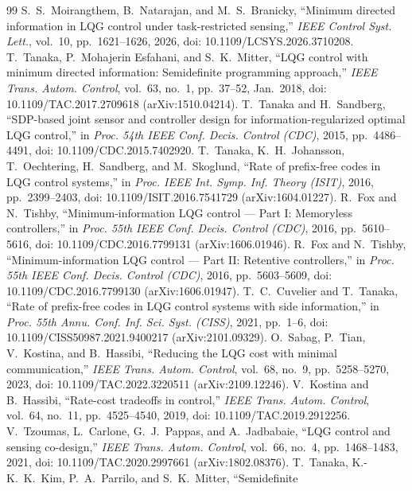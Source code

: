\documentclass[journal]{IEEEtran}
\theoremstyle{remark}
\begin{document}
\begin{thebibliography}{99}
S.~S.~Moirangthem, B.~Natarajan, and M.~S.~Branicky, ``Minimum directed information
in LQG control under task-restricted sensing,'' \emph{IEEE Control Syst. Lett.},
vol.~10, pp.~1621--1626, 2026, doi: 10.1109/LCSYS.2026.3710208.
T.~Tanaka, P.~Mohajerin Esfahani, and S.~K.~Mitter, ``LQG control with minimum
directed information: Semidefinite programming approach,'' \emph{IEEE Trans. Autom.
Control}, vol.~63, no.~1, pp.~37--52, Jan.~2018, doi: 10.1109/TAC.2017.2709618
(arXiv:1510.04214).
T.~Tanaka and H.~Sandberg, ``SDP-based joint sensor and controller design for
information-regularized optimal LQG control,'' in \emph{Proc. 54th IEEE Conf.
Decis. Control (CDC)}, 2015, pp.~4486--4491, doi: 10.1109/CDC.2015.7402920.
T.~Tanaka, K.~H.~Johansson, T.~Oechtering, H.~Sandberg, and M.~Skoglund, ``Rate of
prefix-free codes in LQG control systems,'' in \emph{Proc. IEEE Int. Symp. Inf.
Theory (ISIT)}, 2016, pp.~2399--2403, doi: 10.1109/ISIT.2016.7541729
(arXiv:1604.01227).
R.~Fox and N.~Tishby, ``Minimum-information LQG control --- Part I: Memoryless
controllers,'' in \emph{Proc. 55th IEEE Conf. Decis. Control (CDC)}, 2016,
pp.~5610--5616, doi: 10.1109/CDC.2016.7799131 (arXiv:1606.01946).
R.~Fox and N.~Tishby, ``Minimum-information LQG control --- Part II: Retentive
controllers,'' in \emph{Proc. 55th IEEE Conf. Decis. Control (CDC)}, 2016,
pp.~5603--5609, doi: 10.1109/CDC.2016.7799130 (arXiv:1606.01947).
T.~C.~Cuvelier and T.~Tanaka, ``Rate of prefix-free codes in LQG control systems
with side information,'' in \emph{Proc. 55th Annu. Conf. Inf. Sci. Syst. (CISS)},
2021, pp.~1--6, doi: 10.1109/CISS50987.2021.9400217 (arXiv:2101.09329).
O.~Sabag, P.~Tian, V.~Kostina, and B.~Hassibi, ``Reducing the LQG cost with minimal
communication,'' \emph{IEEE Trans. Autom. Control}, vol.~68, no.~9, pp.~5258--5270,
2023, doi: 10.1109/TAC.2022.3220511 (arXiv:2109.12246).
V.~Kostina and B.~Hassibi, ``Rate-cost tradeoffs in control,'' \emph{IEEE Trans.
Autom. Control}, vol.~64, no.~11, pp.~4525--4540, 2019, doi: 10.1109/TAC.2019.2912256.
V.~Tzoumas, L.~Carlone, G.~J.~Pappas, and A.~Jadbabaie, ``LQG control and sensing
co-design,'' \emph{IEEE Trans. Autom. Control}, vol.~66, no.~4, pp.~1468--1483,
2021, doi: 10.1109/TAC.2020.2997661 (arXiv:1802.08376).
T.~Tanaka, K.-K.~K.~Kim, P.~A.~Parrilo, and S.~K.~Mitter, ``Semidefinite

\end{thebibliography}
\end{document}
